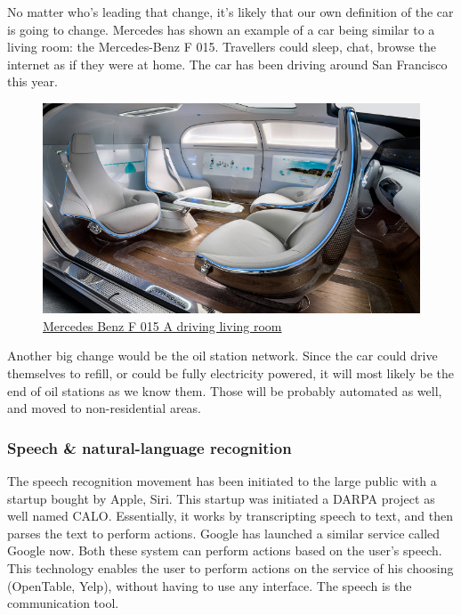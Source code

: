 \documentclass[12pt]{article}
\begin{document}
\smallskip

No matter who's leading that change, it's likely that our own definition of the
car is going to change. Mercedes has shown an example of a car being similar to
a living room: the Mercedes-Benz F 015. Travellers could sleep, chat, browse the
internet as if they were at home. The car has been driving around San Francisco
this year.

\smallskip
\begin{figure}[h]
    \centering
    \includegraphics[width=\linewidth]{mercedes}
    \caption{\href{http://www.entrepreneur.com/article/243751}
    {Mercedes Benz F 015 A driving living room}}
    \label{fig:cost_of_car}
\end{figure}

\smallskip

Another big change would be the oil station network. Since the car could drive
themselves to refill, or could be fully electricity powered, it will most likely
be the end of oil stations as we know them. Those will be probably automated as
well, and moved to non-residential areas.


\subsubsection{Speech \& natural-language recognition}

The speech recognition movement has been initiated to the large public with a
startup bought by Apple, Siri. This startup was initiated a DARPA project as
well named CALO. Essentially, it works by transcripting speech to text, and then
parses the text to perform actions. Google has launched a similar service called
Google now. Both these system can perform actions based on the user's speech.
This technology enables the user to perform actions on the service of his
choosing (OpenTable, Yelp), without having to use any interface. The speech is
the communication tool.
\\
\end{document}
